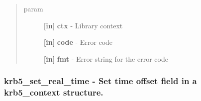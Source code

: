 \documentclass[letterpaper,10pt,english]{sphinxmanual}
\begin{document}
\begin{fulllineitems}
\label{appdev/refs/api/krb5_set_error_message:krb5_set_error_message}
\end{fulllineitems}

\begin{quote}\begin{description}
\item[{param}] \leavevmode
\textbf{{[}in{]}} \textbf{ctx} - Library context

\textbf{{[}in{]}} \textbf{code} - Error code

\textbf{{[}in{]}} \textbf{fmt} - Error string for the error code

\end{description}\end{quote}


\subsubsection{krb5\_set\_real\_time -  Set time offset field in a krb5\_context structure.}
\label{appdev/refs/api/krb5_set_real_time::doc}\label{appdev/refs/api/krb5_set_real_time:krb5-set-real-time-set-time-offset-field-in-a-krb5-context-structure}

\begin{fulllineitems}
\label{appdev/refs/api/krb5_set_real_time:krb5_set_real_time}
\end{fulllineitems}
\end{document}
